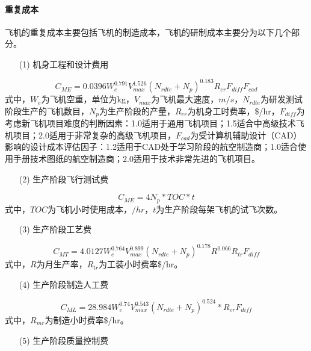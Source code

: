 \documentclass[12pt,a4paper]{report}
\begin{document}
\paragraph{重复成本}

飞机的重复成本主要包括飞机的制造成本，飞机的研制成本主要分为以下几个部分。

\begin{itemize}
    \item[(1)] 机身工程和设计费用
\end{itemize}
\begin{equation}
\label{eq:manufacturingE}
C_{ME}=0.0396W_e ^ {0.791}V_{max}^{1.526}(N_{rdte} + N_p) ^ {0.183} R_{er}F_{diff}F_{cad}
\end{equation}
式中，$W_e$为飞机空重，单位为kg，$V_{max}$为飞机最大速度，$m/s$，$N_{rdte}$为研发测试阶段生产的飞机数目，$N_p$为生产阶段的产量，$R_{er}$为机身工时费率，\$/hr，$F_{diff}$为考虑新飞机项目难度的判断因素：1.0适用于通用飞机项目；1.5适合中高级技术飞机项目；2.0适用于非常复杂的高级飞机项目，$F_{cad}$为受计算机辅助设计（CAD）影响的设计成本评估因子：1.2适用于CAD处于学习阶段的航空制造商；1.0适合使用手册技术图纸的航空制造商；2.0适用于技术非常先进的飞机项目。
\begin{itemize}
    \item[(2)] 生产阶段飞行测试费
\end{itemize}
\begin{equation}
\label{eq:manufacturingF}
C_{ME}=4N_p* TOC * t 
\end{equation}
式中，$TOC$为飞机小时使用成本，$/hr$，$t$为生产阶段每架飞机的试飞次数。
\begin{itemize}
    \item[(3)] 生产阶段工艺费
\end{itemize}
\begin{equation}
\label{eq:manufacturingT}
C_{MT}=4.0127W_e^ {0.764}V_{max} ^ {0.899}(N_{rdte} + N_p) ^ {0.178}R ^ {0.066}R_{tr}F_{diff}
\end{equation}
式中，$R$为月生产率，$R_{tr}$为工装小时费率\$/hr。
\begin{itemize}
    \item[(4)] 生产阶段制造人工费
\end{itemize}
\begin{equation}
\label{eq:manufacturingL}
C_{ML}=28.984W_e ^ {0.74}V_{max} ^ {0.543}(N_{rdte} + N_p) ^ {0.524} * R_{er} F_{diff}
\end{equation}
式中，$R_{mr}$为制造小时费率\$/hr。
\begin{itemize}
    \item[(5)] 生产阶段质量控制费
\end{itemize}
\end{document}
